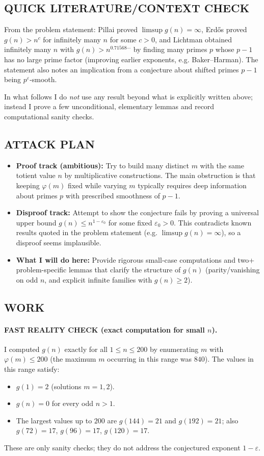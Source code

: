 \subsection*{QUICK LITERATURE/CONTEXT CHECK}
From the problem statement: Pillai proved $\limsup g(n)=\infty$, Erd\H{o}s proved $g(n)>n^c$ for infinitely many $n$ for some $c>0$, and Lichtman obtained infinitely many $n$ with $g(n)>n^{0.71568\cdots}$ by finding many primes $p$ whose $p-1$ has no large prime factor (improving earlier exponents, e.g. Baker--Harman). The statement also notes an implication from a conjecture about shifted primes $p-1$ being $p^{\varepsilon}$-smooth.

In what follows I do \emph{not} use any result beyond what is explicitly written above; instead I prove a few unconditional, elementary lemmas and record computational sanity checks.

\subsection*{ATTACK PLAN}
\begin{itemize}
\item \textbf{Proof track (ambitious):} Try to build many distinct $m$ with the same totient value $n$ by multiplicative constructions. The main obstruction is that keeping $\varphi(m)$ fixed while varying $m$ typically requires deep information about primes $p$ with prescribed smoothness of $p-1$.
\item \textbf{Disproof track:} Attempt to show the conjecture fails by proving a universal upper bound $g(n) \le n^{1-\varepsilon_0}$ for some fixed $\varepsilon_0>0$. This contradicts known results quoted in the problem statement (e.g. $\limsup g(n)=\infty$), so a disproof seems implausible.
\item \textbf{What I will do here:} Provide rigorous small-case computations and two+ problem-specific lemmas that clarify the structure of $g(n)$ (parity/vanishing on odd $n$, and explicit infinite families with $g(n)\ge 2$).
\end{itemize}

\subsection*{WORK}
\paragraph{FAST REALITY CHECK (exact computation for small $n$).}
I computed $g(n)$ exactly for all $1\le n\le 200$ by enumerating $m$ with $\varphi(m)\le 200$ (the maximum $m$ occurring in this range was $840$). The values in this range satisfy:
\begin{itemize}
\item $g(1)=2$ (solutions $m=1,2$).
\item $g(n)=0$ for every odd $n>1$.
\item The largest values up to $200$ are $g(144)=21$ and $g(192)=21$; also $g(72)=17$, $g(96)=17$, $g(120)=17$.
\end{itemize}
These are only sanity checks; they do not address the conjectured exponent $1-\varepsilon$.

